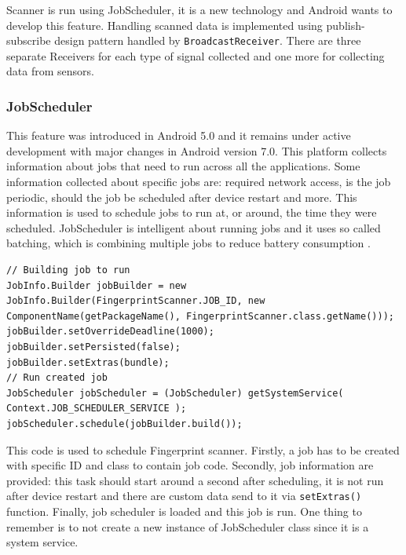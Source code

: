 Scanner is run using JobScheduler, it is a new technology and Android wants to develop this feature. Handling scanned data is implemented using publish-subscribe design pattern handled by \verb|BroadcastReceiver|. There are three separate Receivers for each type of signal collected and one more for collecting data from sensors. 

\subsubsection{JobScheduler}\label{subsubsec:JobScheduler}
This feature was introduced in Android 5.0 and it remains under active development with major changes in Android version 7.0. This platform collects information about jobs that need to run across all the applications. Some information collected about specific jobs are: required network access, is the job periodic, should the job be scheduled after device restart and more. This information is used to schedule jobs to run at, or around, the time they were scheduled. JobScheduler is intelligent about running jobs and it uses so called batching, which is combining multiple jobs to reduce battery consumption \cite{AD, SOTAJS}.

\begin{lstlisting}[caption=Schedule Firngerprint scanner job.]
// Building job to run
JobInfo.Builder jobBuilder = new JobInfo.Builder(FingerprintScanner.JOB_ID, new ComponentName(getPackageName(), FingerprintScanner.class.getName()));
jobBuilder.setOverrideDeadline(1000);
jobBuilder.setPersisted(false);
jobBuilder.setExtras(bundle);
// Run created job
JobScheduler jobScheduler = (JobScheduler) getSystemService( Context.JOB_SCHEDULER_SERVICE );
jobScheduler.schedule(jobBuilder.build());
\end{lstlisting}

This code is used to schedule Fingerprint scanner. Firstly, a job has to be created with specific ID and class to contain job code. Secondly, job information are provided: this task should start around a second after scheduling, it is not run after device restart and there are custom data send to it via \verb|setExtras()| function. Finally, job scheduler is loaded and this job is run. One thing to remember is to not create a new instance of JobScheduler class since it is a system service.

